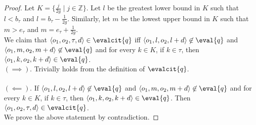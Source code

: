 \begin{proof}
    
    \noindent Let $K=\{\frac{j}{2g} \mid j \in \mathbb{Z} \}$. Let $l$ be the
    greatest lower bound in $K$ such that $l < b_{\tau}$ and $l = b_{\tau} -
    \frac{1}{2g}$. Similarly, let $m$ be the lowest upper bound in $K$ such that $m >
    e_{\tau}$ and $m = e_{\tau} + \frac{1}{2g}$. \\
    
    \noindent We claim that $\langle o_1,o_2,\tau,d \rangle \in \evalcit{q}$
    iff $\langle
    o_1, l,o_2,l+d \rangle \not\in
    \eval{q}$ and $\langle
    o_1,m,o_2,m+d \rangle \not\in
    \eval{q}$ and for every $k \in K$, if $k \in \tau$, then $\langle o_1, k, o_2, k+d \rangle \in \eval{q}$. \\

    \noindent $(\implies).$ Trivially holds from the definition of $\evalcit{q}$. \\\\
    \noindent $(\impliedby).$ If $\langle
    o_1, l,o_2,l+d \rangle \not\in
    \eval{q}$ and $\langle
    o_1,m,o_2,m+d \rangle \not\in
    \eval{q}$ and for every $k \in K$, if $k \in \tau$, then $\langle o_1, k,
    o_2, k+d \rangle \in \eval{q}$. Then $\langle o_1,o_2,\tau,d \rangle \in
    \evalcit{q}$. \\

    \noindent We prove the above statement by contradiction. 




\end{proof}
